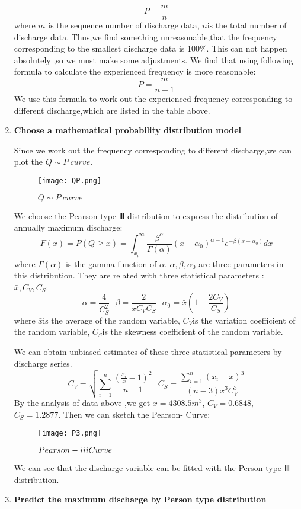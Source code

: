 \documentclass[12pt]{article}%
\begin{document}
\begin{enumerate}[1.]
$$P=\frac{m}{n}$$
where $m$ is the sequence number of discharge data, $n$is the total number of discharge data.
Thus,we find something unreasonable,that the frequency corresponding to the smallest discharge data is 100\%. This can not happen absolutely ,so we must make some adjustments.
  We find that using following formula to calculate the experienced frequency is more reasonable:
     $$P=\frac{m}{n+1}$$
We use this formula to work out the experienced frequency corresponding to different discharge,which are listed in the table above.
	\item{\textbf{Choose a mathematical probability distribution model}}
	\par\noindent
 Since we work out the frequency corresponding to different discharge,we can plot the $Q\sim P\ curve$.
\begin{figure}[H]
	\centering
	\texttt{[image: QP.png]}
	\caption{$Q\sim P\ curve$}
	\label{Q-P}
\end{figure}
We choose the Pearson type Ⅲ distribution to express the distribution of annually maximum discharge:
$$F(x)=P(Q\geq x)=\int_{x_{p}}^{\infty} \frac{\beta ^{\alpha}}{\Gamma (\alpha)}(x-\alpha_{0})^{\alpha -1} e^{-\beta (x-\alpha_{0})}dx	$$
where  $\Gamma (\alpha)$ is the gamma function of $\alpha$. $\alpha,\beta,\alpha_{0} $ are three parameters in this distribution. They are related with three statistical parameters : $\bar x, C_{V},C_{S}$:
$$\alpha = \frac{4}{C_{S}^2} \ \ \ \beta=\frac{2}{\bar x C_{V} C_{S}}\ \ \ \alpha_{0} = \bar x (1-\frac{2C_{V}}{C_{S}})$$
where $\bar x$is the average of the random variable, $C_{V}$is the variation coefficient of the random variable, $C_{S}$is the skewness coefficient of the random variable.
\par\noindent
We can obtain unbiased estimates of these three statistical parameters by discharge series.
$$C_{V}=\sqrt{\sum_{i=1}^n \frac{(\frac{x_{i}}{x}-1)^2}{n-1}}\ \ \ 
C_{S} = \frac{\sum_{i=1}^n (x_{i}-\bar x)^3}{(n-3)\bar x^3 C_{V}^3}$$
By the analysis of data above ,we get $\bar x = 4308.5m^3$, $C_{V}=0.6848$, $C_{S}=1.2877$.
Then we can sketch the Pearson-\uppercase\expandafter{\romannumeral3} Curve:
\begin{figure}[H]
	\centering
	\texttt{[image: P3.png]}
	\caption{$Pearson-\uppercase\expandafter{\romannumeral3} Curve$}
	\label{P3}
\end{figure}
We can see that the discharge variable can be fitted with the Person type Ⅲ distribution.
\item{\textbf{Predict the maximum discharge by Person type \uppercase\expandafter{} distribution}}

\end{enumerate}
\end{document}
